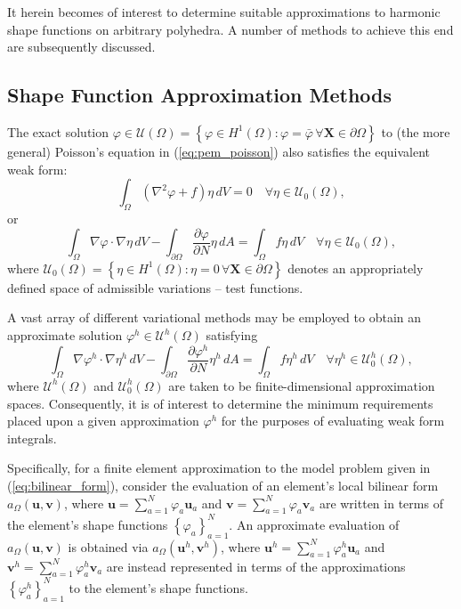 	It herein becomes of interest to determine suitable approximations to harmonic shape functions on arbitrary polyhedra. A number of methods to achieve this end are subsequently discussed.
	
\subsection*{Shape Function Approximation Methods}
	
	The exact solution $\varphi \in \mathcal{U} (\Omega) = \left\{ \varphi \in H^1(\Omega) : \varphi = \bar{\varphi} \, \forall \mathbf{X} \in \partial \Omega \right\}$ to (the more general) Poisson's equation in (\ref{eq:pem_poisson}) also satisfies the equivalent weak form:
	\begin{equation}
		\int_\Omega (\nabla^2 \varphi + f) \eta \, dV = 0 \quad \forall \eta \in \mathcal{U}_0 (\Omega),
	\end{equation}
	or
	\begin{equation}
		\int_\Omega \nabla \varphi \cdot \nabla \eta \, dV - \int_{\partial \Omega} \frac{\partial \varphi}{\partial N} \eta \, dA = \int_\Omega f \eta \, dV \quad \forall \eta \in \mathcal{U}_0 (\Omega),
		\label{eq:weak_bvp}
	\end{equation}
	where $\mathcal{U}_0 (\Omega) = \left\{ \eta \in H^1(\Omega) : \eta = 0 \, \forall \mathbf{X} \in \partial \Omega \right\}$ denotes an appropriately defined space of admissible variations -- test functions.
	
	A vast array of different variational methods may be employed to obtain an approximate solution $\varphi^h \in \mathcal{U}^h (\Omega)$ satisfying
	\begin{equation}
		\int_\Omega \nabla \varphi^h \cdot \nabla \eta^h \, dV - \int_{\partial \Omega} \frac{\partial \varphi^h}{\partial N} \eta^h \, dA = \int_\Omega f \eta^h \, dV \quad \forall \eta^h \in \mathcal{U}^h_0 (\Omega),
		\label{eq:approximate_bvp}
	\end{equation}
	where $\mathcal{U}^h (\Omega)$ and $\mathcal{U}^h_0 (\Omega)$ are taken to be finite-dimensional approximation spaces. Consequently, it is of interest to determine the minimum requirements placed upon a given approximation $\varphi^h$ for the purposes of evaluating weak form integrals.
	
	Specifically, for a finite element approximation to the model problem given in (\ref{eq:bilinear_form}), consider the evaluation of an element's local bilinear form $a_{\Omega}(\mathbf{u},\mathbf{v})$, where $\mathbf{u} = \sum_{a=1}^N \varphi_a \mathbf{u}_a$ and $\mathbf{v} = \sum_{a=1}^N \varphi_a \mathbf{v}_a$ are written in terms of the element's shape functions $\left\{ \varphi_a \right\}_{a=1}^N$. An approximate evaluation of $a_{\Omega}(\mathbf{u},\mathbf{v})$ is obtained via $a_{\Omega}(\mathbf{u}^h,\mathbf{v}^h)$, where $\mathbf{u}^h = \sum_{a=1}^N \varphi^h_a \mathbf{u}_a$ and $\mathbf{v}^h = \sum_{a=1}^N \varphi^h_a \mathbf{v}_a$ are instead represented in terms of the approximations $\left\{ \varphi^h_a \right\}_{a=1}^N$ to the element's shape functions.
	
